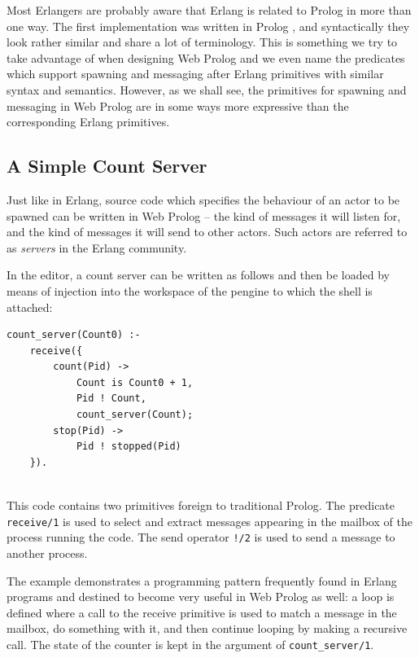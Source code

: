 \documentclass{tlp}
\begin{document}
\vspace{2mm}

\noindent Most Erlangers are probably aware that Erlang is related to Prolog in more than one way. The first implementation was written in Prolog \cite{DBLP:conf/hopl/Armstrong07}, and syntactically they look rather similar and share a lot of terminology. This is something we try to take advantage of when designing Web Prolog and we even name the predicates which support spawning and messaging after Erlang primitives with similar syntax and semantics. However, as we shall see, the primitives for spawning and messaging in Web Prolog are in some ways more expressive than the corresponding Erlang primitives.




\subsection{A Simple Count Server}\label{sec:count-server}

Just like in Erlang, source code which specifies the behaviour of an actor to be spawned can be written in Web Prolog -- the kind of messages it will listen for, and the kind of messages it will send to other actors. Such actors are referred to as \textit{servers} in the Erlang community.

In the editor, a count server can be written as follows and then be loaded by means of injection into the workspace of the pengine to which the shell is attached: 

\begin{lstlisting}
count_server(Count0) :-                 
    receive({             
        count(Pid) ->
            Count is Count0 + 1,    
            Pid ! Count,   
            count_server(Count);
        stop(Pid) ->
            Pid ! stopped(Pid)     
    }).                   
	                      
\end{lstlisting}

\noindent This code contains two primitives foreign to traditional Prolog. The predicate \texttt{receive/1} is used to select and extract messages appearing in the mailbox of the process running the code. The send operator \texttt{!/2} is used to send a message to another process.

The example demonstrates a programming pattern frequently found in Erlang programs and destined to become very useful in Web Prolog as well: a loop is defined where a call to the receive primitive is used to match a message in the mailbox, do something with it, and then continue looping by making a recursive call. The state of the counter is kept in the argument of \texttt{count\_server/1}.
\end{document}
